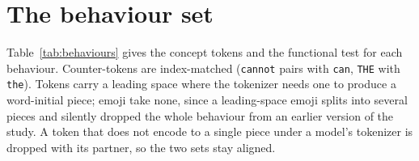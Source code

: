 \documentclass{article}
\begin{document}



\appendix

\section{The behaviour set}
\label{app:behaviours}

Table~\ref{tab:behaviours} gives the concept tokens and the functional test for each behaviour. Counter-tokens are index-matched (\texttt{cannot} pairs with \texttt{can}, \texttt{THE} with \texttt{the}). Tokens carry a leading space where the tokenizer needs one to produce a word-initial piece; emoji take none, since a leading-space emoji splits into several pieces and silently dropped the whole behaviour from an earlier version of the study. A token that does not encode to a single piece under a model's tokenizer is dropped with its partner, so the two sets stay aligned.
\end{document}
